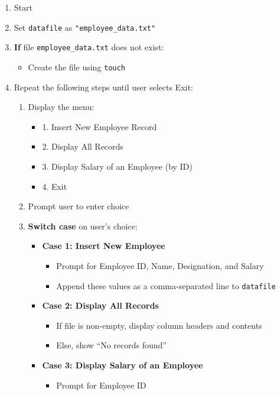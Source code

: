 \begin{enumerate}
    \item Start
    \item Set \texttt{datafile} as \texttt{"employee\_data.txt"}
    \item \textbf{If} file \texttt{employee\_data.txt} does not exist:
    \begin{itemize}
        \item Create the file using \texttt{touch}
    \end{itemize}
    \item Repeat the following steps until user selects Exit:
    \begin{enumerate}[label=\alph*.]
        \item Display the menu:
        \begin{itemize}
            \item 1. Insert New Employee Record
            \item 2. Display All Records
            \item 3. Display Salary of an Employee (by ID)
            \item 4. Exit
        \end{itemize}
        \item Prompt user to enter choice
        \item \textbf{Switch case} on user's choice:
        \begin{itemize}
            \item \textbf{Case 1: Insert New Employee}
            \begin{itemize}
                \item Prompt for Employee ID, Name, Designation, and Salary
                \item Append these values as a comma-separated line to \texttt{datafile}
            \end{itemize}
            \item \textbf{Case 2: Display All Records}
            \begin{itemize}
                \item If file is non-empty, display column headers and contents
                \item Else, show ``No records found''
            \end{itemize}
            \item \textbf{Case 3: Display Salary of an Employee}
            \begin{itemize}
                \item Prompt for Employee ID

\end{itemize}
\end{itemize}
\end{enumerate}
\end{enumerate}
